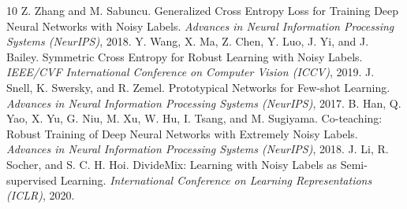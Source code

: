 \documentclass{article}
\begin{document}
%   
%   
\begin{thebibliography}{10}
  Z. Zhang and M. Sabuncu.
  Generalized Cross Entropy Loss for Training Deep Neural Networks with Noisy Labels.
  \emph{Advances in Neural Information Processing Systems (NeurIPS)}, 2018.
  Y. Wang, X. Ma, Z. Chen, Y. Luo, J. Yi, and J. Bailey.
  Symmetric Cross Entropy for Robust Learning with Noisy Labels.
  \emph{IEEE/CVF International Conference on Computer Vision (ICCV)}, 2019.
  J. Snell, K. Swersky, and R. Zemel.
  Prototypical Networks for Few-shot Learning.
  \emph{Advances in Neural Information Processing Systems (NeurIPS)}, 2017.
  B. Han, Q. Yao, X. Yu, G. Niu, M. Xu, W. Hu, I. Tsang, and M. Sugiyama.
  Co-teaching: Robust Training of Deep Neural Networks with Extremely Noisy Labels.
  \emph{Advances in Neural Information Processing Systems (NeurIPS)}, 2018.
  J. Li, R. Socher, and S. C. H. Hoi.
  DivideMix: Learning with Noisy Labels as Semi-supervised Learning.
  \emph{International Conference on Learning Representations (ICLR)}, 2020.
\end{thebibliography}
\end{document}
